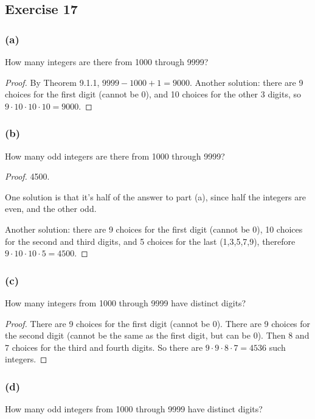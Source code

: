 \documentclass[14pt]{extarticle}
\begin{document}
\subsection{Exercise 17}
\subsubsection{(a)}
How many integers are there from 1000 through 9999?

\begin{proof}
By Theorem 9.1.1, \(9999-1000+1 = 9000\). Another solution: there are 9 choices for the first digit (cannot be 0), and
10 choices for the other 3 digits, so \(9 \cdot 10 \cdot 10 \cdot 10 = 9000\).
\end{proof}

\subsubsection{(b)}
How many odd integers are there from 1000 through 9999?

\begin{proof}
4500.

One solution is that it's half of the answer to part (a), since half the integers are even, and the other odd. 

Another solution: there are 9 choices for the first digit (cannot be 0), 10 choices for the second and third digits,
and 5 choices for the last (1,3,5,7,9), therefore \(9 \cdot 10 \cdot 10 \cdot 5 = 4500\).
\end{proof}

\subsubsection{(c)}
How many integers from 1000 through 9999 have distinct digits?

\begin{proof}
There are 9 choices for the first digit (cannot be 0). There are 9 choices for the second digit (cannot be the same as the first digit, but can be 0). Then 8 and 7 choices for the third and fourth digits. So there are  
\(9 \cdot 9 \cdot 8 \cdot 7 = 4536\) such integers.
\end{proof}

\subsubsection{(d)}
How many odd integers from 1000 through 9999 have distinct digits?
\end{document}
